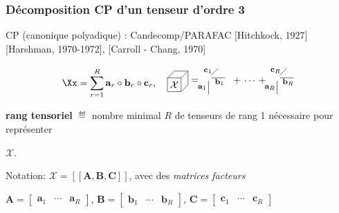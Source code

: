 \documentclass[9pt,table]{beamer} %
\newcommand{\cpd}[3]{[\![#1, #2, #3]\!]}
\newcommand{\bfa}{\mathbf{a}}
\newcommand{\bfb}{\mathbf{b}}
\newcommand{\bfc}{\mathbf{c}}
\newcommand{\vect}[1]{\mathbf{#1}}
\newcommand{\matr}[1]{\mathbf{#1}}
\begin{document}
\begin{frame}
\frametitle{Décomposition CP d'un tenseur d'ordre 3}

CP (canonique polyadique) : Candecomp/PARAFAC
[Hitchkock, 1927] [Harshman, 1970-1972], [Carroll - Chang, 1970]

\[
\Xx = \sum\limits_{r=1}^{R} \bfa_r \circ \bfb_r \circ \bfc_r, 
\quad 
\raisebox{-0.3\height}{\begin{tikzpicture}
\begin{scope}[scale= 0.5]
\draw(0.5,0.5) node (A) {$\mathcal{X}$};
\draw(0,0) rectangle (1,1);
\draw(0,1) -- (0.5,1.5) -- (1.5,1.5) -- (1.5,0.5) --(1,0);
\draw(1,1) -- (1.5,1.5);

\draw(2,0.8) node (eq) {$=$};
\draw(6,0.8) node (eq) {$\quad+\,\cdots\,+\quad$};
\end{scope}

\begin{scope}[scale= 0.5,xshift=1cm]
\draw(2,-0.2) -- (2,0.8);
\draw(2.1,0.3) node[anchor=east] (s21) {\small {\footnotesize$\bfa_1$}};
\draw(2.2,1) -- (3.2,1);
\draw(2.8,1.2) node[anchor=north] (s22) {\small {\footnotesize$\bfb_1$}};
\draw(2.2,1.2) -- (2.7,1.7);
\draw(2.5,1.1) node[anchor=south east] (s23) {\small{\footnotesize$\bfc_1$}};
\end{scope}

\begin{scope}[scale= 0.5,xshift=6cm]
\draw(2,-0.2) -- (2,0.8);
\draw(2.1,0.3) node[anchor=east] (s21) {\small {\footnotesize$\bfa_R$}};
\draw(2.2,1) -- (3.2,1);
\draw(2.8,1.2) node[anchor=north] (s22) {\small {\footnotesize$\bfb_R$}};
\draw(2.2,1.2) -- (2.7,1.7);
\draw(2.5,1.1) node[anchor=south east] (s23) {\small {\footnotesize$\bfc_R$}};
\end{scope}
\end{tikzpicture}}
\]

\begin{tcolorbox}[width=\textwidth]
\textbf{rang tensoriel}  $\eqdef$ nombre minimal $R$ de tenseurs de rang 1 nécessaire pour représenter 

\hfill $\mathcal{X}$.
\end{tcolorbox}
 
  
 \vspace{2em}
 
Notation:  $\mathcal{X} = \cpd{\matr{A}}{\matr{B}}{\matr{C}}$, avec des \emph{matrices facteurs}

$\matr{A} = \begin{bmatrix}\vect{a}_1 & \cdots & \vect{a}_R \end{bmatrix}$, $\matr{B} = \begin{bmatrix}\vect{b}_1 & \cdots & \vect{b}_R \end{bmatrix}$, $\matr{C} = \begin{bmatrix}\vect{c}_1 & \cdots & \vect{c}_R \end{bmatrix}$ 
\vspace*{1cm}
\end{frame}
\end{document}

